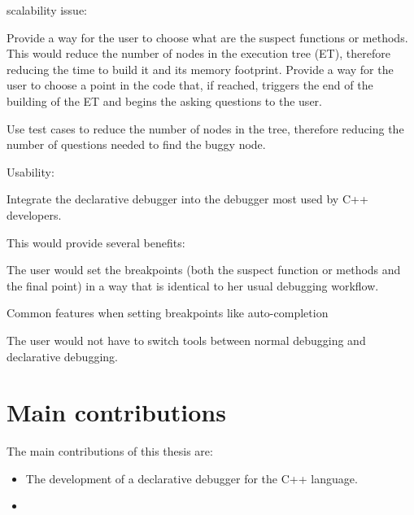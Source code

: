 scalability issue:

Provide a way for the user to choose what are the suspect functions or methods.
This would reduce the number of nodes in the execution tree (ET), therefore reducing the time to build it and its memory footprint.
Provide a way for the user to choose a point in the code that, if reached, triggers the end of the building of the ET and begins the asking questions to the user.

Use test cases to reduce the number of nodes in the tree, therefore reducing the number of questions needed to find the buggy node.

Usability:

Integrate the declarative debugger into the debugger most used by C++ developers.

This would provide several benefits:

The user would set the breakpoints (both the suspect function or methods and the final point) in a way that is identical to her usual debugging workflow.

Common features when setting breakpoints like auto-completion

The user would not have to switch tools between normal debugging and declarative debugging.
\section{Main contributions}

The main contributions of this thesis are:
\begin{itemize}
\item The development of a declarative debugger for the C++ language.
\item 
\end{itemize}